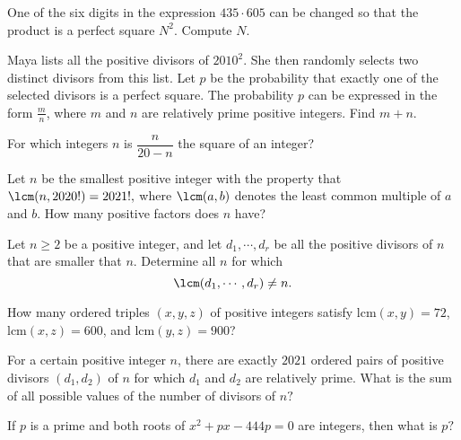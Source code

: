 \documentclass[mast]{lucky}
\begin{document}
\begin{prob}[SMT 2018]{2}
One of the six digits in the expression $435 \cdot 605$ can be changed so that the product is a perfect square $N^2.$ Compute $N.$
\end{prob}

\begin{prob}[AIME I 2010/1]{2}
Maya lists all the positive divisors of $2010^2$. She then randomly selects two distinct divisors from this list. Let $p$ be the probability that exactly one of the selected divisors is a perfect square. The probability $p$ can be expressed in the form $\frac {m}{n}$, where $m$ and $n$ are relatively prime positive integers. Find $m + n$.
\end{prob}

\begin{prob}[AMC 12B 2002/12]{2}
For which integers $n$ is $\dfrac n{20-n}$ the square of an integer?
\end{prob}

\begin{req}{3}
Let $n$ be the smallest positive integer with the property that $\lcm(n, 2020!) = 2021!,$ where $\lcm(a, b)$ denotes the least common multiple of $a$ and $b.$ How many positive factors does $n$ have?
\end{req}

\begin{prob}{3}
Let $n \ge 2$ be a positive integer, and let $d_1,\cdots , d_r$ be all the positive divisors of $n$ that are smaller that $n$. Determine all $n$ for which
\[\lcm(d_1,\cdots , d_r) \neq n.\]
\end{prob}

\begin{req}[AMC 12A 2016/22]{3}
How many ordered triples $(x, y, z)$ of positive integers satisfy $\text{lcm}(x, y) = 72$, $\text{lcm}(x, z)= 600$, and $\text{lcm}(y, z) = 900$?
\end{req}

\begin{prob}[CMC 10A 2021/22]{4}
For a certain positive integer $n$, there are exactly $2021$ ordered pairs of positive divisors $(d_1, d_2)$ of $n$ for which $d_1$ and $d_2$ are relatively prime. What is the sum of all possible values of the number of divisors of $n?$
\end{prob}

\begin{prob}[AHSME 1987/23]{4}
If $p$ is a prime and both roots of $x^2+px-444p=0$ are integers, then what is $p?$
\end{prob}
\end{document}
